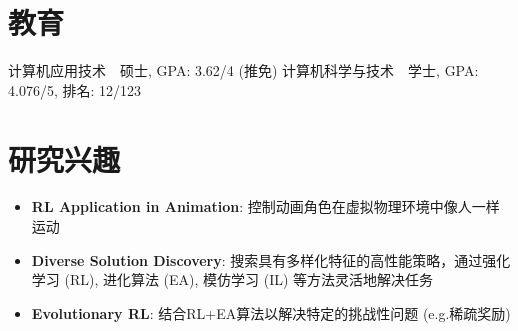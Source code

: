 \documentclass{resume}
\newcommand{\resumeItem}[2]{
  \item{
    \textbf{#1}{: #2}
  }
}
\newcommand{\resumeSubItem}[2]{\resumeItem{#1}{#2}}
\newcommand{\resumeSubHeadingListStart}{\begin{itemize}[leftmargin=*]}
\newcommand{\resumeSubHeadingListEnd}{\end{itemize}}
\begin{document}



\section{教育}
计算机应用技术~~硕士, GPA: 3.62/4 (推免)
计算机科学与技术~~学士, GPA: 4.076/5, 排名: 12/123

\section{研究兴趣}
  \resumeSubHeadingListStart
    \resumeSubItem{RL Application in Animation}
      {控制动画角色在虚拟物理环境中像人一样运动}
    \resumeSubItem{Diverse Solution Discovery}
      {搜索具有多样化特征的高性能策略，通过强化学习 (RL), 进化算法 (EA), 模仿学习 (IL) 等方法灵活地解决任务}
    \resumeSubItem{Evolutionary RL}
      {结合RL+EA算法以解决特定的挑战性问题 (e.g.稀疏奖励)}
   \resumeSubHeadingListEnd
%
\end{document}
